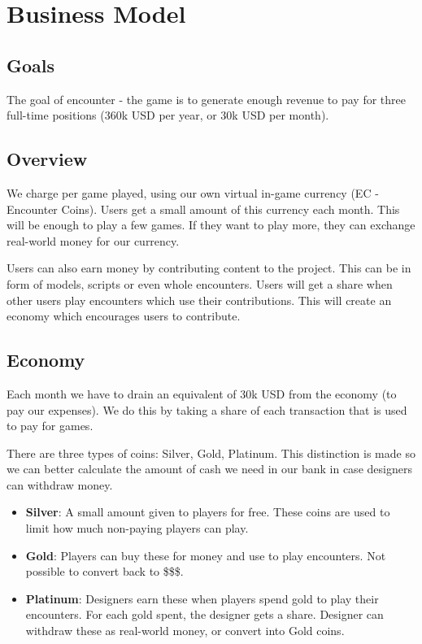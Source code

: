\documentclass[10pt]{scrartcl}
\begin{document}
\section{Business Model}

\subsection{Goals}
The goal of encounter - the game is to generate enough revenue to pay for
three full-time positions (360k USD per year, or 30k USD per month).

\subsection{Overview}

We charge per game played, using our own virtual in-game currency (EC
- Encounter Coins). Users get a small amount of this currency each month. This
will be enough to play a few games. If they want to play more, they can
exchange real-world money for our currency.

Users can also earn money by contributing content to the project. This can be
in form of models, scripts or even whole encounters. Users will get a share
when other users play encounters which use their contributions. This will
create an economy which encourages users to contribute.


\subsection{Economy}

Each month we have to drain an equivalent of 30k USD from the economy (to pay
our expenses). We do this by taking a share of each transaction that is used
to pay for games.

There are three types of coins: Silver, Gold, Platinum. This distinction is
made so we can better calculate the amount of cash we need in our bank in case
designers can withdraw money.

\begin{itemize}

  \item \textbf{Silver}: A small amount given to players for free. These coins
      are used to limit how much non-paying players can play.

  \item \textbf{Gold}: Players can buy these for money and use to play
      encounters. Not possible to convert back to \$\$\$.

  \item \textbf{Platinum}: Designers earn these when players spend gold to
      play their encounters. For each gold spent, the designer gets a share.
      Designer can withdraw these as real-world money, or convert into Gold
      coins.

\end{itemize}
\end{document}
